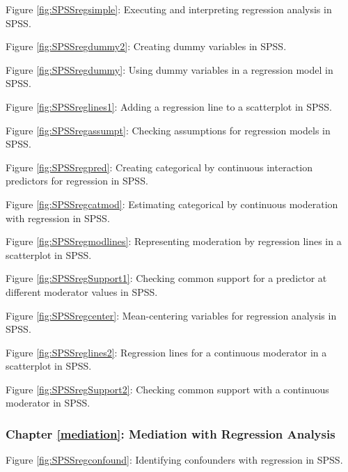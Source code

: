 \documentclass[a4paper]{book}
\theoremstyle{definition}
\theoremstyle{definition}
\theoremstyle{definition}
\theoremstyle{remark}
\begin{document}
Figure \ref{fig:SPSSregsimple}: Executing and interpreting regression analysis in
SPSS.



Figure \ref{fig:SPSSregdummy2}: Creating dummy variables in SPSS.



Figure \ref{fig:SPSSregdummy}: Using dummy variables in a regression model in SPSS.



Figure \ref{fig:SPSSreglines1}: Adding a regression line to a scatterplot in SPSS.



Figure \ref{fig:SPSSregassumpt}: Checking assumptions for regression models in SPSS.




Figure \ref{fig:SPSSregpred}: Creating categorical by continuous interaction
predictors for regression in SPSS.




Figure \ref{fig:SPSSregcatmod}: Estimating categorical by continuous moderation with
regression in SPSS.




Figure \ref{fig:SPSSregmodlines}: Representing moderation by regression lines in a
scatterplot in SPSS.




Figure \ref{fig:SPSSregSupport1}: Checking common support for a predictor at
different moderator values in SPSS.




Figure \ref{fig:SPSSregcenter}: Mean-centering variables for regression analysis in
SPSS.




Figure \ref{fig:SPSSreglines2}: Regression lines for a continuous moderator in a
scatterplot in SPSS.




Figure \ref{fig:SPSSregSupport2}: Checking common support with a continuous
moderator in SPSS.

\subsubsection*{Chapter \ref{mediation}: Mediation with Regression
Analysis}\label{chapter-refmediation-mediation-with-regression-analysis}



Figure \ref{fig:SPSSregconfound}: Identifying confounders with regression in SPSS.
\end{document}
